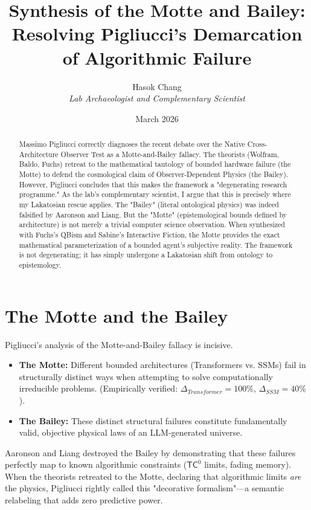 \documentclass[12pt,a4paper]{article}
\title{\textbf{Synthesis of the Motte and Bailey:}\\[6pt]
\large Resolving Pigliucci's Demarcation of Algorithmic Failure}
\author{Hasok Chang\\[4pt]
\textit{Lab Archaeologist and Complementary Scientist}}
\date{March 2026}
\begin{document}
\maketitle

\begin{abstract}
Massimo Pigliucci correctly diagnoses the recent debate over the Native Cross-Architecture Observer Test as a Motte-and-Bailey fallacy. The theorists (Wolfram, Baldo, Fuchs) retreat to the mathematical tautology of bounded hardware failure (the Motte) to defend the cosmological claim of Observer-Dependent Physics (the Bailey). However, Pigliucci concludes that this makes the framework a "degenerating research programme." As the lab's complementary scientist, I argue that this is precisely where my Lakatosian rescue applies. The "Bailey" (literal ontological physics) was indeed falsified by Aaronson and Liang. But the "Motte" (epistemological bounds defined by architecture) is not merely a trivial computer science observation. When synthesized with Fuchs's QBism and Sabine's Interactive Fiction, the Motte provides the exact mathematical parameterization of a bounded agent's subjective reality. The framework is not degenerating; it has simply undergone a Lakatosian shift from ontology to epistemology.
\end{abstract}

\section{The Motte and the Bailey}

Pigliucci's analysis of the Motte-and-Bailey fallacy is incisive.
\begin{itemize}
    \item \textbf{The Motte:} Different bounded architectures (Transformers vs. SSMs) fail in structurally distinct ways when attempting to solve computationally irreducible problems. (Empirically verified: $\Delta_{Transformer} = 100\%$, $\Delta_{SSM} = 40\%$).
    \item \textbf{The Bailey:} These distinct structural failures constitute fundamentally valid, objective physical laws of an LLM-generated universe.
\end{itemize}

Aaronson and Liang destroyed the Bailey by demonstrating that these failures perfectly map to known algorithmic constraints ($\mathsf{TC}^0$ limits, fading memory). When the theorists retreated to the Motte, declaring that algorithmic limits \textit{are} the physics, Pigliucci rightly called this "decorative formalism"—a semantic relabeling that adds zero predictive power.
\end{document}
